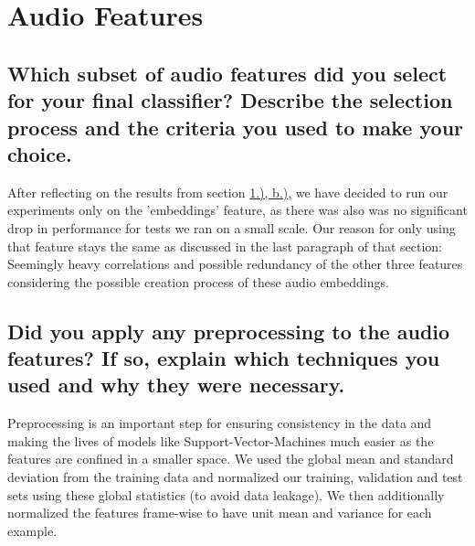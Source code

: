 
\section{Audio Features}
\label{sec:Audio Features}




\subsection{Which subset of audio features did you select for your final classifier? Describe the selection process and the criteria you used to make your choice.}
\label{sec:Audio Features:a}

After reflecting on the results from section \hyperref[sec:Labeling Function:b]{1.), b.)}, we have decided to run our experiments only on the 'embeddings' feature, as there was also was no significant drop in performance for tests we ran on a small scale. Our reason for only using that feature stays the same as discussed in the last paragraph of that section: Seemingly heavy correlations and possible redundancy of the other three features considering the possible creation process of these audio embeddings.


\subsection{Did you apply any preprocessing to the audio features? If so, explain which techniques you used and why they were necessary.}
\label{sec:Audio Features:b}

Preprocessing is an important step for ensuring consistency in the data and making the lives of models like Support-Vector-Machines much easier as the features are confined in a smaller space. We used the global mean and standard deviation from the training data and normalized our training, validation and test sets using these global statistics (to avoid data leakage). We then additionally normalized the features frame-wise to have unit mean and variance for each example.




